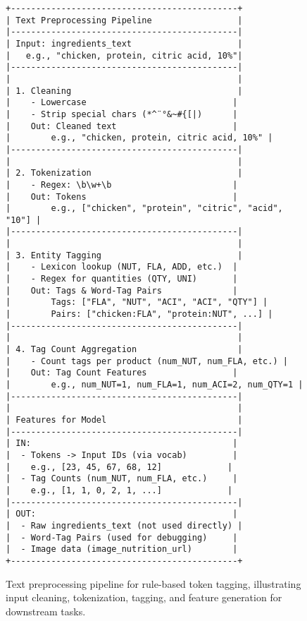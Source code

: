 \documentclass[11pt]{article}
\begin{document}
\begin{figure}[H]
\centering
\begin{lstlisting}[basicstyle=\ttfamily\small,breaklines=true,columns=flexible,frame=single,xleftmargin=0pt]
+---------------------------------------------+
| Text Preprocessing Pipeline                 |
|---------------------------------------------|
| Input: ingredients_text                     |
|   e.g., "chicken, protein, citric acid, 10%"|
|---------------------------------------------|
|                                             |
| 1. Cleaning                                 |
|    - Lowercase                             |
|    - Strip special chars (*^¨°&~#{[|)      |
|    Out: Cleaned text                       |
|        e.g., "chicken, protein, citric acid, 10%" |
|---------------------------------------------|
|                                             |
| 2. Tokenization                             |
|    - Regex: \b\w+\b                        |
|    Out: Tokens                             |
|        e.g., ["chicken", "protein", "citric", "acid", "10"] |
|---------------------------------------------|
|                                             |
| 3. Entity Tagging                           |
|    - Lexicon lookup (NUT, FLA, ADD, etc.)  |
|    - Regex for quantities (QTY, UNI)       |
|    Out: Tags & Word-Tag Pairs              |
|        Tags: ["FLA", "NUT", "ACI", "ACI", "QTY"] |
|        Pairs: ["chicken:FLA", "protein:NUT", ...] |
|---------------------------------------------|
|                                             |
| 4. Tag Count Aggregation                    |
|    - Count tags per product (num_NUT, num_FLA, etc.) |
|    Out: Tag Count Features                 |
|        e.g., num_NUT=1, num_FLA=1, num_ACI=2, num_QTY=1 |
|---------------------------------------------|
|                                             |
| Features for Model                          |
|---------------------------------------------|
| IN:                                        |
|  - Tokens -> Input IDs (via vocab)         |
|    e.g., [23, 45, 67, 68, 12]             |
|  - Tag Counts (num_NUT, num_FLA, etc.)     |
|    e.g., [1, 1, 0, 2, 1, ...]             |
|---------------------------------------------|
| OUT:                                       |
|  - Raw ingredients_text (not used directly) |
|  - Word-Tag Pairs (used for debugging)     |
|  - Image data (image_nutrition_url)        |
+---------------------------------------------+
\end{lstlisting}
\caption{Text preprocessing pipeline for rule-based token tagging, illustrating input cleaning, tokenization, tagging, and feature generation for downstream tasks.}
\label{fig:tagging_pipeline}
\end{figure}
\end{document}

